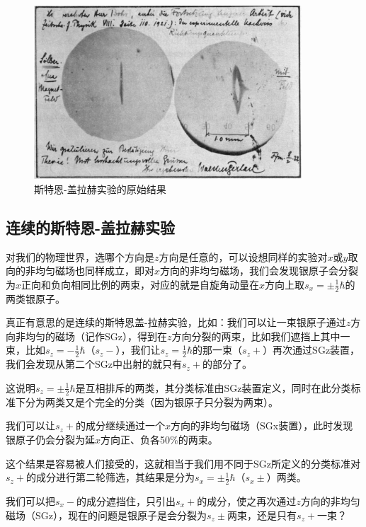 \begin{figure}[htbp]
\begin{center}
\includegraphics[width=10cm]{SGExperiment/sg-result.jpg}
\caption{斯特恩-盖拉赫实验的原始结果}
\end{center}
\end{figure}

\subsection{连续的斯特恩-盖拉赫实验}

对我们的物理世界，选哪个方向是$z$方向是任意的，可以设想同样的实验对$x$或$y$取向的非均匀磁场也同样成立，即对$x$方向的非均匀磁场，我们会发现银原子会分裂为$x$正向和负向相同比例的两束，对应的就是自旋角动量在$x$方向上取$s_x = \pm \frac{1}{2} \hbar$的两类银原子。

真正有意思的是连续的斯特恩盖-拉赫实验，比如：我们可以让一束银原子通过$z$方向非均匀的磁场（记作SGz），得到在$z$方向分裂的两束，比如我们遮挡上其中一束，比如$s_z = - \frac{1}{2} \hbar$（$s_z -$），我们让$s_z = \frac{1}{2} \hbar$的那一束（$s_z +$）再次通过SGz装置，我们会发现从第二个SGz中出射的就只有$s_z +$的部分了。

这说明$s_z = \pm \frac{1}{2} \hbar$是互相排斥的两类，其分类标准由SGz装置定义，同时在此分类标准下分为两类又是个完全的分类（因为银原子只分裂为两束）。

我们可以让$s_z +$的成分继续通过一个$x$方向的非均匀磁场（SGx装置），此时发现银原子仍会分裂为延$x$方向正、负各50\%的两束。

这个结果是容易被人们接受的，这就相当于我们用不同于SGz所定义的分类标准对$s_z +$的成分进行第二轮筛选，其结果是分为$s_x = \pm \frac{1}{2} \hbar$（$s_x \pm$）两类。

我们可以把$s_x -$的成分遮挡住，只引出$s_x +$的成分，使之再次通过$z$方向的非均匀磁场（SGz），现在的问题是银原子是会分裂为$s_z \pm$两束，还是只有$s_z +$一束？

